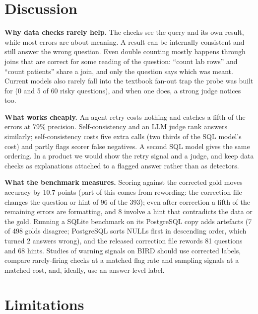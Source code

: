 \documentclass[10pt,twocolumn]{article}
\begin{document}
\section{Discussion}

\textbf{Why data checks rarely help.} The checks see the query and its own result, while most errors
are about meaning. A result can be internally consistent and still answer the wrong question. Even
double counting mostly happens through joins that are correct for some reading of the question:
``count lab rows'' and ``count patients'' share a join, and only the question says which was meant. Current
models also rarely fall into the textbook fan-out trap the probe was built for (0 and 5 of 60 risky
questions), and when one does, a strong judge notices too.

\textbf{What works cheaply.} An agent retry costs nothing and catches a fifth of the errors at 79\%
precision. Self-consistency and an LLM judge rank answers similarly; self-consistency costs five extra
calls (two thirds of the SQL model's cost) and partly flags scorer false negatives. A second SQL model
gives the same ordering. In a product we would show the retry signal and a judge, and keep data checks as explanations
attached to a flagged answer rather than as detectors.

\textbf{What the benchmark measures.} Scoring against the corrected gold moves accuracy by 10.7
points (part of this comes from rewording: the correction file changes the question or hint of 96 of
the 393); even after
correction a fifth of the remaining errors are formatting, and 8 involve a hint that contradicts the
data or the gold. Running a SQLite benchmark on its PostgreSQL copy adds artefacts (7 of 498 golds
disagree; PostgreSQL sorts NULLs first in descending order, which turned 2 answers wrong), and the
released correction file rewords 81 questions and 68 hints. Studies of warning signals on BIRD should
use corrected labels, compare rarely-firing checks at a matched flag rate and sampling signals at a
matched cost, and, ideally, use an answer-level label.

\section*{Limitations}
\end{document}
